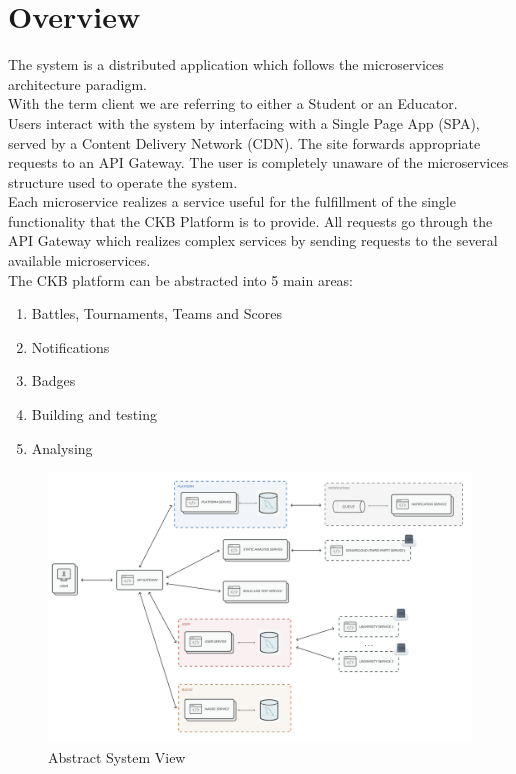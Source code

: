 \section{Overview}
The system is a distributed application which follows the microservices architecture paradigm.\\
With the term client we are referring to either a Student or an Educator.\\
Users interact with the system by interfacing with a Single Page App (SPA), served by a Content Delivery Network (CDN).
The site forwards appropriate requests to an API Gateway.
The user is completely unaware of the microservices structure used to operate the system.\\
Each microservice realizes a service useful for the fulfillment of the single functionality that the CKB Platform is to provide.
All requests go through the API Gateway which realizes complex services by sending requests to the several available microservices.\\
The CKB platform can be abstracted into 5 main areas:
\begin{enumerate}

    \item Battles, Tournaments, Teams and Scores
    \item Notifications
    \item Badges
    \item Building and testing
    \item Analysing

\end{enumerate}

\begin{figure}[H]
    \centering
    \includegraphics[width=\textwidth]{../images/abstract-system-layout.PNG}
    \caption{Abstract System View}
    \label{fig:Abstract System View}
\end{figure}

